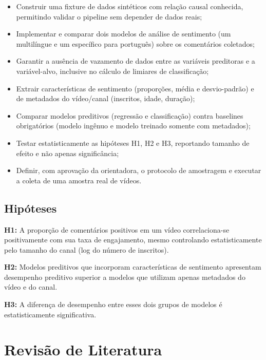 \documentclass[12pt,a4paper]{article}
\begin{document}
\begin{itemize}
    \item Construir uma fixture de dados sintéticos com relação causal conhecida, permitindo validar o pipeline sem depender de dados reais;
    \item Implementar e comparar dois modelos de análise de sentimento (um multilíngue e um específico para português) sobre os comentários coletados;
    \item Garantir a ausência de vazamento de dados entre as variáveis preditoras e a variável-alvo, inclusive no cálculo de limiares de classificação;
    \item Extrair características de sentimento (proporções, média e desvio-padrão) e de metadados do vídeo/canal (inscritos, idade, duração);
    \item Comparar modelos preditivos (regressão e classificação) contra baselines obrigatórios (modelo ingênuo e modelo treinado somente com metadados);
    \item Testar estatisticamente as hipóteses H1, H2 e H3, reportando tamanho de efeito e não apenas significância;
    \item Definir, com aprovação da orientadora, o protocolo de amostragem e executar a coleta de uma amostra real de vídeos.
\end{itemize}

\subsection{Hipóteses}

\textbf{H1:} A proporção de comentários positivos em um vídeo correlaciona-se positivamente com sua taxa de engajamento, mesmo controlando estatisticamente pelo tamanho do canal (log do número de inscritos).

\textbf{H2:} Modelos preditivos que incorporam características de sentimento apresentam desempenho preditivo superior a modelos que utilizam apenas metadados do vídeo e do canal.

\textbf{H3:} A diferença de desempenho entre esses dois grupos de modelos é estatisticamente significativa.

\section{Revisão de Literatura}
\end{document}
